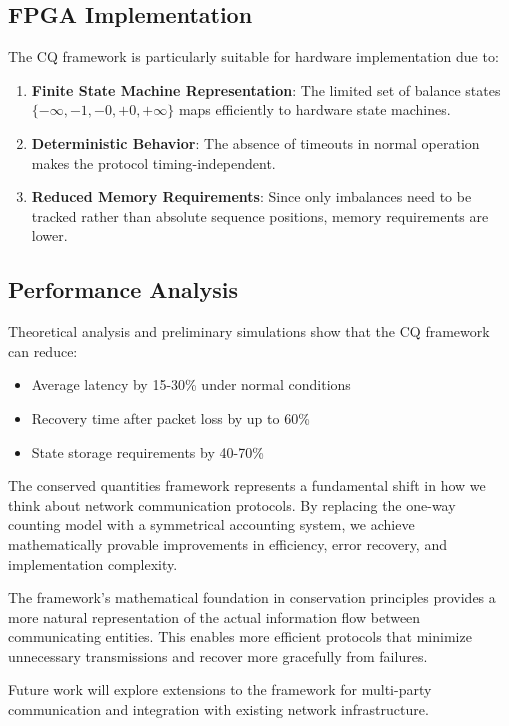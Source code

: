 \documentclass[../OAE-SPEC-MAIN.tex]{subfiles}
\begin{document}
\subsection{FPGA Implementation}

The CQ framework is particularly suitable for hardware implementation due to:

\begin{enumerate}
    \item \textbf{Finite State Machine Representation}: The limited set of balance states $\{-\infty,-1,-0,+0,+\infty\}$ maps efficiently to hardware state machines.
    
    \item \textbf{Deterministic Behavior}: The absence of timeouts in normal operation makes the protocol timing-independent.
    
    \item \textbf{Reduced Memory Requirements}: Since only imbalances need to be tracked rather than absolute sequence positions, memory requirements are lower.
\end{enumerate}

\subsection{Performance Analysis}

Theoretical analysis and preliminary simulations show that the CQ framework can reduce:

\begin{itemize}
    \item Average latency by 15-30\% under normal conditions
    \item Recovery time after packet loss by up to 60\%
    \item State storage requirements by 40-70\%
\end{itemize}

The conserved quantities framework represents a fundamental shift in how we think about network communication protocols. By replacing the one-way counting model with a symmetrical accounting system, we achieve mathematically provable improvements in efficiency, error recovery, and implementation complexity.

The framework's mathematical foundation in conservation principles provides a more natural representation of the actual information flow between communicating entities. This enables more efficient protocols that minimize unnecessary transmissions and recover more gracefully from failures.

Future work will explore extensions to the framework for multi-party communication and integration with existing network infrastructure.
\end{document}
